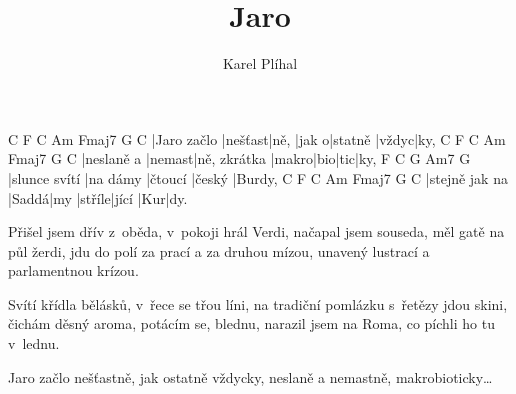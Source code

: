 \documentclass{song}
\author{Karel Plíhal}
\title{Jaro}
\begin{document}
\strophe
C           F       C    Am    Fmaj7   G     C
|Jaro začlo |nešťast|ně, |jak o|statně |vždyc|ky,
C          F      C            Am    Fmaj7   G C
|neslaně a |nemast|ně, zkrátka |makro|bio|tic|ky,
F             C        G       Am7    G
|slunce svítí |na dámy |čtoucí |český |Burdy,
C              F     C   Am     Fmaj7 G  C
|stejně jak na |Saddá|my |stříle|jící |Kur|dy. 
\endstrophe

\strophe*
Přišel jsem dřív z~oběda, v~pokoji hrál Verdi, 
načapal jsem souseda, měl gatě na půl žerdi, 
jdu do polí za prací a za druhou mízou, 
unavený lustrací a parlamentnou krízou.
\endstrophe

\strophe*
Svítí křídla bělásků, v~řece se třou líni, 
na tradiční pomlázku s~řetězy jdou skini, 
čichám děsný aroma, potácím se, blednu, 
narazil jsem na Roma, co píchli ho tu v~lednu. 
\endstrophe

\strophe*
Jaro začlo nešťastně, jak ostatně vždycky,
neslaně a nemastně, makrobioticky\ldots
\endstrophe
\end{document}

